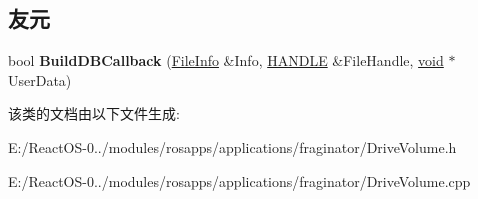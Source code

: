 \subsection*{友元}
\begin{DoxyCompactItemize}
\item 
\mbox{\label{class_drive_volume_a512bba5248095bac39cdbc8f2b3b9745}} 
bool {\bfseries Build\+D\+B\+Callback} (\hyperlink{struct_file_info}{File\+Info} \&Info, \hyperlink{interfacevoid}{H\+A\+N\+D\+LE} \&File\+Handle, \hyperlink{interfacevoid}{void} $\ast$User\+Data)
\end{DoxyCompactItemize}


该类的文档由以下文件生成\+:\begin{DoxyCompactItemize}
\item 
E\+:/\+React\+O\+S-\/0../modules/rosapps/applications/fraginator/Drive\+Volume.\+h\item 
E\+:/\+React\+O\+S-\/0../modules/rosapps/applications/fraginator/Drive\+Volume.\+cpp\end{DoxyCompactItemize}
